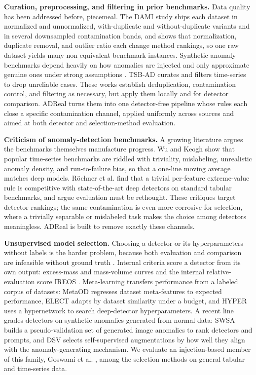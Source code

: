 \documentclass[3p,twocolumn]{elsarticle}
\begin{document}
\textbf{Curation, preprocessing, and filtering in prior benchmarks.} Data quality has been addressed before, piecemeal. The DAMI study \cite{ref16} ships each dataset in normalized and unnormalized, with-duplicate and without-duplicate variants and in several downsampled contamination bands, and shows that normalization, duplicate removal, and outlier ratio each change method rankings, so one raw dataset yields many non-equivalent benchmark instances. Synthetic-anomaly benchmarks depend heavily on how anomalies are injected and only approximate genuine ones under strong assumptions \cite{ref7}. TSB-AD \cite{ref19} curates and filters time-series to drop unreliable cases. These works establish deduplication, contamination control, and filtering as necessary, but apply them locally and for detector comparison. ADReal turns them into one detector-free pipeline whose rules each close a specific contamination channel, applied uniformly across sources and aimed at both detector and selection-method evaluation.

\textbf{Criticism of anomaly-detection benchmarks.} A growing literature argues the benchmarks themselves manufacture progress. Wu and Keogh \cite{ref30} show that popular time-series benchmarks are riddled with triviality, mislabeling, unrealistic anomaly density, and run-to-failure bias, so that a one-line moving average matches deep models. Röchner et al. \cite{ref34} find that a trivial per-feature extreme-value rule is competitive with state-of-the-art deep detectors on standard tabular benchmarks, and argue evaluation must be rethought. These critiques target detector rankings; the same contamination is even more corrosive for selection, where a trivially separable or mislabeled task makes the choice among detectors meaningless. ADReal is built to remove exactly these channels.

\textbf{Unsupervised model selection.} Choosing a detector or its hyperparameters without labels is the harder problem, because both evaluation and comparison are infeasible without ground truth \cite{ref3}. Internal criteria score a detector from its own output: excess-mass and mass-volume curves \cite{ref1} and the internal relative-evaluation score IREOS \cite{ref2}. Meta-learning transfers performance from a labeled corpus of datasets: MetaOD \cite{ref3} regresses dataset meta-features to expected performance, ELECT \cite{ref21} adapts by dataset similarity under a budget, and HYPER \cite{ref22} uses a hypernetwork to search deep-detector hyperparameters. A recent line grades detectors on synthetic anomalies generated from normal data: SWSA \cite{ref24} builds a pseudo-validation set of generated image anomalies to rank detectors and prompts, and DSV \cite{ref25} selects self-supervised augmentations by how well they align with the anomaly-generating mechanism. We evaluate an injection-based member of this family, Goswami et al. \cite{ref35}, among the selection methods on general tabular and time-series data.
\end{document}

